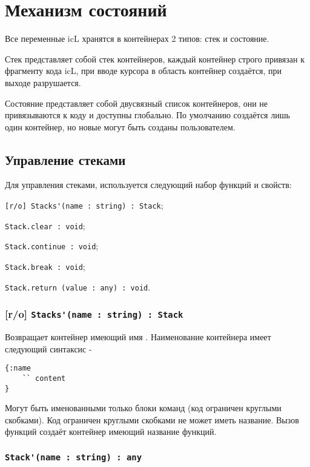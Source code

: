 \section{Механизм состояний}

Все переменные icL хранятся в контейнерах 2 типов: стек и состояние.

Стек представляет собой стек контейнеров, каждый контейнер строго привязан к фрагменту кода icL, при вводе курсора в область контейнер создаётся, при выходе разрушается.

Состояние представляет собой двусвязный список контейнеров, они не привязываются к коду и доступны глобально. По умолчанию создаётся лишь один контейнер, но новые могут быть созданы пользователем.

\subsection{Управление стеками}

Для управления стеками, используется следующий набор функций и свойств:
\begin{icItems}
	\item \lstinline|[r/o] Stacks'(name : string) : Stack|;
	\item \lstinline|Stack.clear : void|;
	\item \lstinline|Stack.continue : void|;
	\item \lstinline|Stack.break : void|;
	\item \lstinline|Stack.return (value : any) : void|.
\end{icItems}

\subsubsection{[r/o] \lstinline|Stacks'(name : string) : Stack|}

Возвращает контейнер имеющий имя . Наименование контейнера имеет следующий синтаксис -
\begin{lstlisting}[numbers=none]
{:name
	`` content
}
\end{lstlisting}
Могут быть именованными только блоки команд (код ограничен круглыми скобками). Код ограничен круглыми скобками не может иметь название. Вызов функций создаёт контейнер имеющий название функций.

\subsubsection{\lstinline|Stack'(name : string) : any|}

